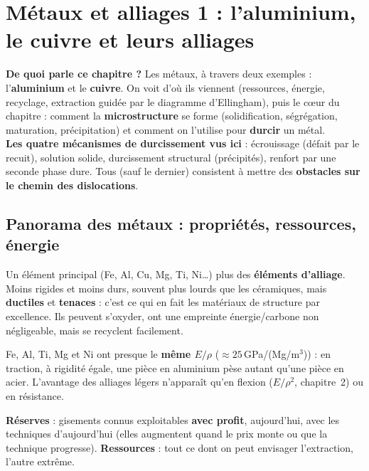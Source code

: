 \chapter{Métaux et alliages 1 : l'aluminium, le cuivre et leurs alliages}

\begin{rembox}[title=En bref]
\textbf{De quoi parle ce chapitre ?} Les métaux, à travers deux exemples : l'\textbf{aluminium}
et le \textbf{cuivre}. On voit d'où ils viennent (ressources, énergie, recyclage, extraction
guidée par le diagramme d'Ellingham), puis le c\oe ur du chapitre : comment la
\textbf{microstructure} se forme (solidification, ségrégation, maturation, précipitation) et
comment on l'utilise pour \textbf{durcir} un métal. \\
\textbf{Les quatre mécanismes de durcissement vus ici} : écrouissage (défait par le recuit),
solution solide, durcissement structural (précipités), renfort par une seconde phase dure. Tous
(sauf le dernier) consistent à mettre des \textbf{obstacles sur le chemin des dislocations}.
\end{rembox}

\section{Panorama des métaux : propriétés, ressources, énergie}

\begin{propbox}[title=Ce qui distingue les métaux et alliages]
Un élément principal (Fe, Al, Cu, Mg, Ti, Ni\ldots) plus des \textbf{éléments d'alliage}. Moins
rigides et moins durs, souvent plus lourds que les céramiques, mais \textbf{ductiles} et
\textbf{tenaces} : c'est ce qui en fait les matériaux de structure par excellence. Ils peuvent
s'oxyder, ont une empreinte énergie/carbone non négligeable, mais se recyclent facilement.
\end{propbox}

\begin{rembox}[title={Une coïncidence utile}]
Fe, Al, Ti, Mg et Ni ont presque le \textbf{même $E/\rho$} ($\approx 25$\,GPa/(Mg/m$^3$)) : en
traction, à rigidité égale, une pièce en aluminium pèse autant qu'une pièce en acier. L'avantage
des alliages légers n'apparaît qu'en flexion ($E/\rho^2$, chapitre~2) ou en résistance.
\end{rembox}

\begin{defnbox}[title={Réserves et ressources}]
\textbf{Réserves} : gisements connus exploitables \textbf{avec profit}, aujourd'hui, avec les
techniques d'aujourd'hui (elles augmentent quand le prix monte ou que la technique progresse).
\textbf{Ressources} : tout ce dont on peut envisager l'extraction, l'autre extrême.
\end{defnbox}

